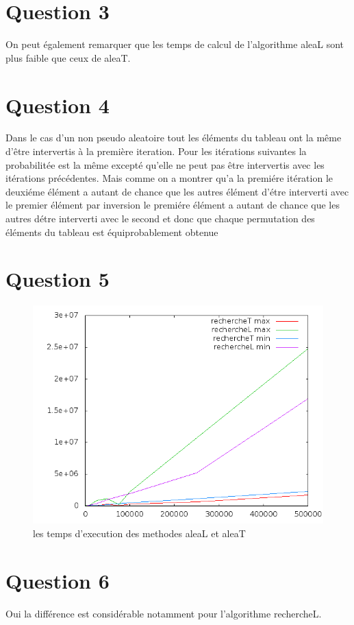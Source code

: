 \documentclass[a4paper,12pt]{report}
\begin{document}
\section*{Question 3}
On peut également remarquer que les temps de calcul de l'algorithme aleaL sont plus faible que ceux de aleaT.

\section*{Question 4}
Dans le cas d'un non pseudo aleatoire tout les éléments du tableau ont la même d'être intervertis à la première iteration. Pour les itérations suivantes la probabilitée est la même excepté qu'elle ne peut pas être intervertis avec les itérations précédentes. Mais comme on a montrer qu'a la premiére itération le deuxiéme élément a autant de chance que les autres élément d'étre interverti avec le premier élément par inversion le premiére élément a autant de chance que les autres détre interverti avec le second et donc que chaque permutation des éléments du tableau est équiprobablement obtenue


\newpage


\section*{Question 5}
\begin{figure}[!ht]
	\center
	\includegraphics[scale=0.5]{q5.png}
	\caption{les temps d’execution des methodes aleaL et aleaT}
\end{figure}

\section*{Question 6}
Oui la différence est considérable notamment pour l'algorithme rechercheL.
\end{document}
